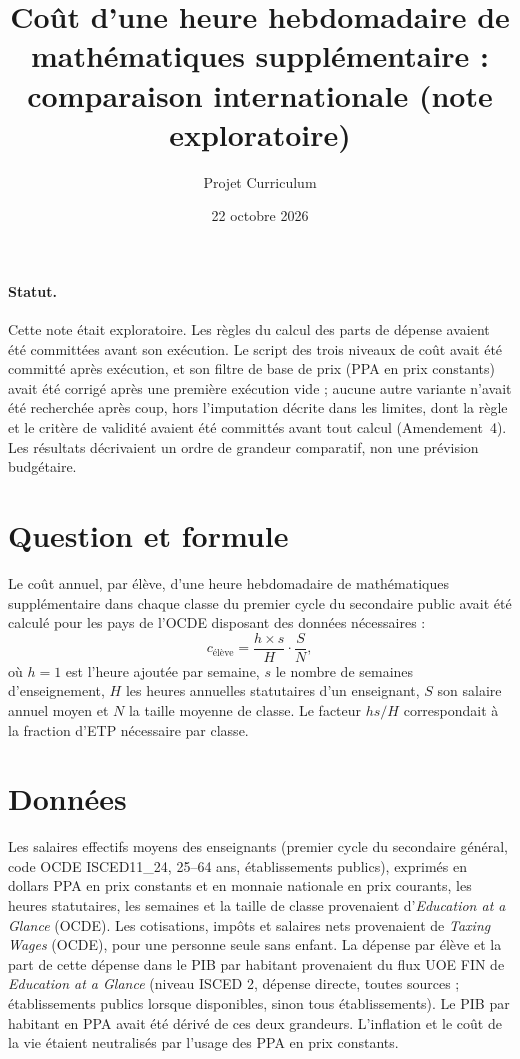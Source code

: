 \documentclass[11pt,a4paper]{article}
\title{Coût d'une heure hebdomadaire de mathématiques supplémentaire :\\comparaison internationale (note exploratoire)}
\author{Projet Curriculum}
\date{22 octobre 2026}
\begin{document}
\maketitle

\paragraph{Statut.} Cette note était exploratoire. Les règles du calcul des parts de dépense avaient été committées avant son exécution. Le script des trois niveaux de coût avait été committé après exécution, et son filtre de base de prix (PPA en prix constants) avait été corrigé après une première exécution vide ; aucune autre variante n'avait été recherchée après coup, hors l'imputation décrite dans les limites, dont la règle et le critère de validité avaient été committés avant tout calcul (Amendement~4). Les résultats décrivaient un ordre de grandeur comparatif, non une prévision budgétaire.

\section{Question et formule}
Le coût annuel, par élève, d'une heure hebdomadaire de mathématiques supplémentaire dans chaque classe du premier cycle du secondaire public avait été calculé pour les pays de l'OCDE disposant des données nécessaires :
\[
c_{\text{élève}} = \frac{h \times s}{H}\cdot\frac{S}{N},
\]
où $h=1$ est l'heure ajoutée par semaine, $s$ le nombre de semaines d'enseignement, $H$ les heures annuelles statutaires d'un enseignant, $S$ son salaire annuel moyen et $N$ la taille moyenne de classe. Le facteur $hs/H$ correspondait à la fraction d'ETP nécessaire par classe.

\section{Données}
Les salaires effectifs moyens des enseignants (premier cycle du secondaire général, code OCDE ISCED11\_24, 25--64 ans, établissements publics), exprimés en dollars PPA en prix constants et en monnaie nationale en prix courants, les heures statutaires, les semaines et la taille de classe provenaient d'\emph{Education at a Glance} (OCDE). Les cotisations, impôts et salaires nets provenaient de \emph{Taxing Wages} (OCDE), pour une personne seule sans enfant. La dépense par élève et la part de cette dépense dans le PIB par habitant provenaient du flux UOE FIN de \emph{Education at a Glance} (niveau ISCED 2, dépense directe, toutes sources ; établissements publics lorsque disponibles, sinon tous établissements). Le PIB par habitant en PPA avait été dérivé de ces deux grandeurs. L'inflation et le coût de la vie étaient neutralisés par l'usage des PPA en prix constants.
\end{document}
